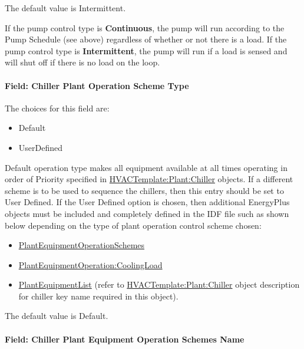 The default value is Intermittent.

If the pump control type is \textbf{Continuous}, the pump will run according to the Pump Schedule (see above) regardless of whether or not there is a load. If the pump control type is \textbf{Intermittent}, the pump will run if a load is sensed and will shut off if there is no load on the loop.

\paragraph{Field: Chiller Plant Operation Scheme Type}\label{field-chiller-plant-operation-scheme-type}

The choices for this field are:

\begin{itemize}
\item
  Default
\item
  UserDefined
\end{itemize}

Default operation type makes all equipment available at all times operating in order of Priority specified in \hyperref[hvactemplateplantchiller]{HVACTemplate:Plant:Chiller} objects. If a different scheme is to be used to sequence the chillers, then this entry should be set to User Defined. If the User Defined option is chosen, then additional EnergyPlus objects must be included and completely defined in the IDF file such as shown below depending on the type of plant operation control scheme chosen:

\begin{itemize}
\item
  \hyperref[plantequipmentoperationschemes]{PlantEquipmentOperationSchemes}
\item
  \hyperref[plantequipmentoperationcoolingload]{PlantEquipmentOperation:CoolingLoad}
\item
  \hyperref[plantequipmentlist]{PlantEquipmentList} (refer to \hyperref[hvactemplateplantchiller]{HVACTemplate:Plant:Chiller} object description for chiller key name required in this object).
\end{itemize}

The default value is Default.

\paragraph{Field: Chiller Plant Equipment Operation Schemes Name}\label{field-chiller-plant-equipment-operation-schemes-name}


